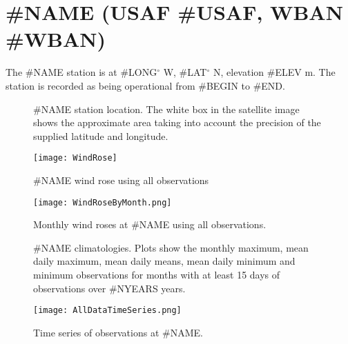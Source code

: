 \section{#NAME (USAF #USAF, WBAN #WBAN)}

The #NAME station is at #LONG$^\circ$ W, #LAT$^\circ$ N, elevation #ELEV m. The station is recorded as being operational from #BEGIN to #END.

\begin{figure}[!ht]
        \centering
	\hfill
        \caption{#NAME station location. The white box in the satellite image shows the approximate area taking into account the precision of the supplied latitude and longitude.}
\end{figure} 

\begin{figure}[!ht]
\centering
\texttt{[image: WindRose]}
\caption{#NAME wind rose using all observations}
\end{figure}

\clearpage
\begin{figure}[!ht]
\centering
\texttt{[image: WindRoseByMonth.png]}
\caption{Monthly wind roses at #NAME using all observations.}
\end{figure}

\begin{figure}[!ht]
        \centering
	\hfill
        \caption[#NAME temperature and wind speed climatologies]{#NAME climatologies. Plots show the monthly maximum, mean daily maximum, mean daily means, mean daily minimum and minimum observations for months with at least 15 days of observations over #NYEARS years.}
\end{figure} 

\clearpage
\begin{figure}[!h]
\centering
\texttt{[image: AllDataTimeSeries.png]}
\caption{Time series of observations at #NAME.}
\end{figure}
\clearpage